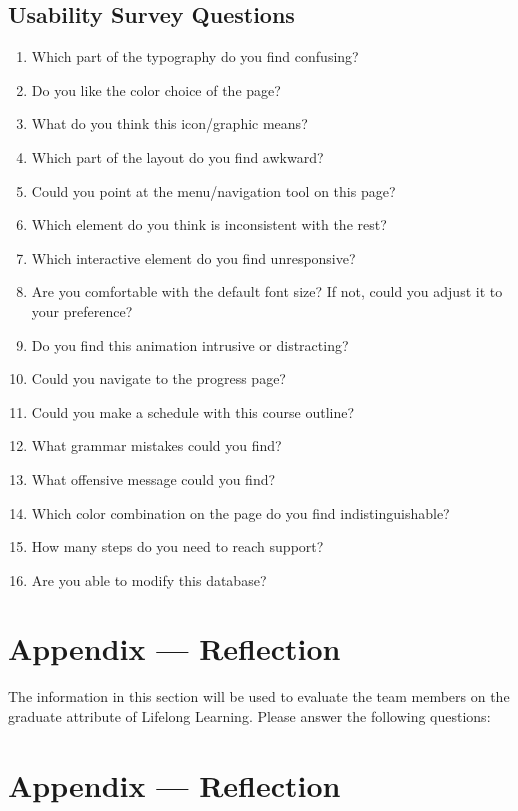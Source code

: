 \documentclass[12pt, titlepage]{article}
\begin{document}
\subsection{Usability Survey Questions}

\begin{enumerate}
  \item Which part of the typography do you find confusing?
  \item Do you like the color choice of the page?
  \item What do you think this icon/graphic means?
  \item Which part of the layout do you find awkward?
  \item Could you point at the menu/navigation tool on this page?
  \item Which element do you think is inconsistent with the rest?
  \item Which interactive element do you find unresponsive?
  \item Are you comfortable with the default font size? If not, could you adjust it to your preference?
  \item Do you find this animation intrusive or distracting?
  \item Could you navigate to the progress page?
  \item Could you make a schedule with this course outline?
  \item What grammar mistakes could you find?
  \item What offensive message could you find?
  \item Which color combination on the page do you find indistinguishable?
  \item How many steps do you need to reach support?
  \item Are you able to modify this database?
\end{enumerate}

\newpage{}
\section*{Appendix --- Reflection}

The information in this section will be used to evaluate the team members on the
graduate attribute of Lifelong Learning.  Please answer the following questions:

\newpage{}
\section*{Appendix --- Reflection}
\end{document}
